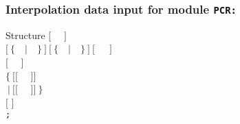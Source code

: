 \subsubsection{Interpolation data input for module {\tt PCR:}}\label{sect:descPCR}

\begin{DataStructure}{Structure }
$[$~ ~$]$ \\
$[~\{$~~$|$~~$\}~]~[~\{$~~$|$~~$\}~]~[$~~~$]$ \\
$[$~ ~$]$ \\
$\{~[[$~  ~$]]$ \\ 
$~|~[[$~  ~$]]~\}$ \\
$[$  $]$ \\
{\tt ;}
\end{DataStructure}

